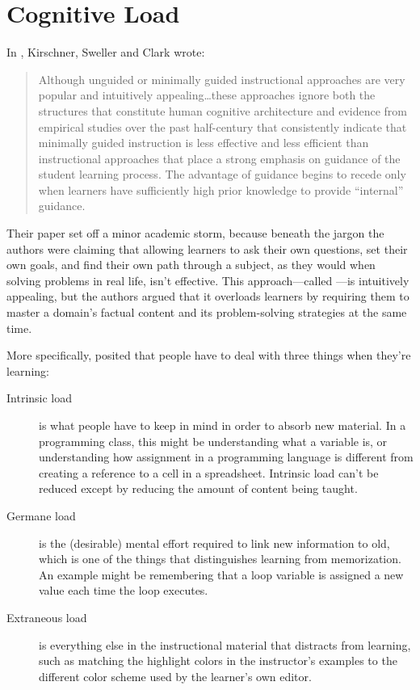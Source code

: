 \chapter{Cognitive Load}\label{s:load}

In \cite{Kirs2006}, Kirschner, Sweller and Clark wrote:

\begin{quote}

Although unguided or minimally guided instructional approaches are
very popular and intuitively appealing{\ldots}these approaches
ignore both the structures that constitute human cognitive
architecture and evidence from empirical studies over the past
half-century that consistently indicate that minimally guided
instruction is less effective and less efficient than instructional
approaches that place a strong emphasis on guidance of the student
learning process. The advantage of guidance begins to recede only when
learners have sufficiently high prior knowledge to provide ``internal''
guidance.

\end{quote}

Their paper set off a minor academic storm, because beneath the jargon
the authors were claiming that allowing learners to ask their own
questions, set their own goals, and find their own path through a
subject, as they would when solving problems in real life, isn't
effective. This approach---called
---is
intuitively appealing, but the authors argued that it overloads learners
by requiring them to master a domain's factual content and its
problem-solving strategies at the same time.

More specifically, 
posited that people have to deal with three things when they're
learning:

\begin{description}
\item[Intrinsic load]
is what people have to keep in mind in order to absorb new material.
In a programming class, this might be understanding what a variable
is, or understanding how assignment in a programming language is
different from creating a reference to a cell in a spreadsheet.
Intrinsic load can't be reduced except by reducing the amount of
content being taught.
\item[Germane load]
is the (desirable) mental effort required to link new information to
old, which is one of the things that distinguishes learning from
memorization. An example might be remembering that a loop variable
is assigned a new value each time the loop executes.
\item[Extraneous load]
is everything else in the instructional material that distracts from
learning, such as matching the highlight colors in the instructor's
examples to the different color scheme used by the learner's own
editor.
\end{description}

